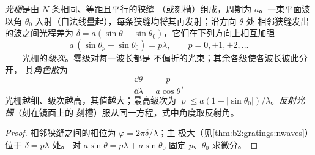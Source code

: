 \begin{proposition}[光栅方程]\label{prop:b2:gratings:equation}
\emph{光栅}是由 $N$ 条相同、等距且平行的狭缝
（或刻槽）组成，周期为 $a$。一束平面波以角 $\theta_0$
入射（自法线量起），每条狭缝均将其再发射；沿方向 $\theta$ 处
相邻狭缝发出的波之间光程差为 $\delta = a(\sin\theta
- \sin\theta_0)$，它们在下列方向上相互加强
\[
a\,(\sin\theta_p - \sin\theta_0) = p\lambda , \qquad p = 0, \pm1, \pm2, \dots
\]
——光栅的\emph{级次}。零级对每一波长都是
不偏折的光束；其余各级使各波长彼此分开，
其\emph{角色散}为
\[
\frac{\dd\theta}{\dd\lambda} = \frac{p}{a\cos\theta} ,
\]
光栅越细、级次越高，其值越大；最高级次为
$|p| \le a(1 + |\sin\theta_0|)/\lambda$。\emph{反射光栅}（刻在镜面上的
刻槽）服从同一方程，式中角度取反射角。
\end{proposition}

\begin{proof}
相邻狭缝之间的相位为 $\varphi = 2\pi\delta/\lambda$；主
极大（见\cref{thm:b2:gratings:nwaves}）位于 $\delta = p\lambda$ 处。
对 $a\sin\theta = p\lambda + a\sin\theta_0$ 固定 $p$、$\theta_0$ 求微分。
\end{proof}

